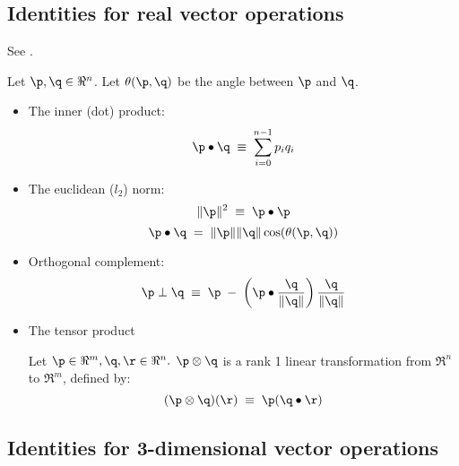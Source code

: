 \label{sec:general}



\subsection{Identities for real vector operations}
\label{sec:RX}

See \cite[p.~85, ex.~4-9]{Spivak:1965:CalculusOnManifolds}.

Let $\p, \q \in \Re^{n}$.
Let $\theta(\p,\q)$ be the angle between $\p$ and $\q$.

\begin{itemize}
\item The inner (dot) product:
\begin{equation}
\p \bullet \q \; \equiv \; \sum_{i=0}^{n-1} p_i q_i
\end{equation}

\item The euclidean ($l_2$) norm:
\begin{equation}
\| \p \|^2 \; \equiv \; \p \bullet \p
\end{equation}
\begin{equation}
\p \bullet \q \; = \; \| \p \| \| \q \| \cos(\theta(\p,\q))
\end{equation}

\item Orthogonal complement:
\begin{equation}
\p \perp \q \; \equiv \; \p \; - \; \left( \p \bullet \frac{\q}{\|\q\|}\right) \frac{\q}{\|\q\|}
\end{equation}

\item The tensor product

Let $\p \in \Re^m, \q, \r \in \Re^n.$
$\p \otimes \q$ is a rank 1 linear transformation
from $\Re^n$ to $\Re^m$, defined by:
\begin{equation}
(\p \otimes \q)(\r) \; \equiv \; \p (\q \bullet \r)
\end{equation}

\end{itemize}


\subsection{Identities for 3-dimensional vector operations}
\label{sec:R3X}

